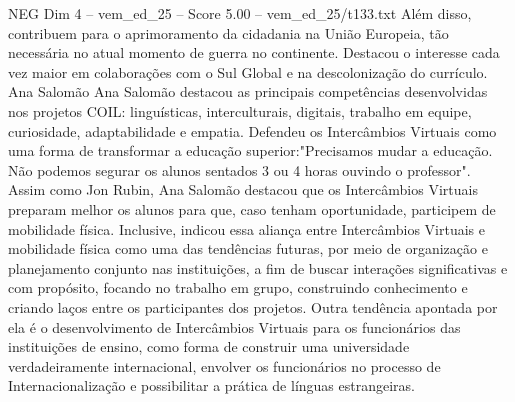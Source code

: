 \begin{textsample}{NEG Dim 4 – vem\_ed\_25 – Score 5.00 – vem\_ed\_25/t133.txt}
Além disso, contribuem para o aprimoramento da cidadania na União Europeia, tão necessária no atual momento de guerra no continente.
Destacou o interesse cada vez maior em colaborações com o Sul Global e na descolonização do currículo.
Ana Salomão Ana Salomão destacou as principais competências desenvolvidas nos projetos COIL: linguísticas, interculturais, digitais, trabalho em equipe, curiosidade, adaptabilidade e empatia.
Defendeu os Intercâmbios Virtuais como uma forma de transformar a educação superior:"Precisamos mudar a educação.
Não podemos segurar os alunos sentados 3 ou 4 horas ouvindo o professor".
Assim como Jon Rubin, Ana Salomão destacou que os Intercâmbios Virtuais preparam melhor os alunos para que, caso tenham oportunidade, participem de mobilidade física.
Inclusive, indicou essa aliança entre Intercâmbios Virtuais e mobilidade física como uma das tendências futuras, por meio de organização e planejamento conjunto nas instituições, a fim de buscar interações significativas e com propósito, focando no trabalho em grupo, construindo conhecimento e criando laços entre os participantes dos projetos.
Outra tendência apontada por ela é o desenvolvimento de Intercâmbios Virtuais para os funcionários das instituições de ensino, como forma de construir uma universidade verdadeiramente internacional, envolver os funcionários no processo de Internacionalização e possibilitar a prática de línguas estrangeiras.

\end{textsample}
